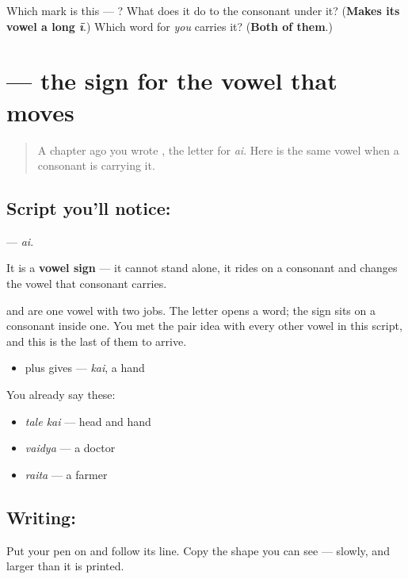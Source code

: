 \begin{tcolorbox}[breakable,colback=teal!4,colframe=teal!35!black,title={Before you move on}]
Which mark is this — ? What does it do to the consonant under it? (\textbf{Makes its vowel a long \emph{ī}}.) Which word for \emph{you} carries it? (\textbf{Both of them}.)
\end{tcolorbox}
\section[\texorpdfstring{\kn{◌ೈ} (ai)}{◌ೈ (ai)}]{ — the sign for the vowel that moves}

\label{lesson:KA-S162-vowel-sign-ai}



\begin{quote}
A chapter ago you wrote \textbf{}, the letter for \emph{ai}. Here is the same vowel when a consonant is carrying it.
\end{quote}

\subsection*{Script you'll notice: }
\textbf{} — \emph{ai}.

It is a \textbf{vowel sign} — it cannot stand alone, it rides on a consonant and changes the vowel that consonant carries.

\textbf{} and \textbf{} are one vowel with two jobs. The letter opens a word; the sign sits on a consonant inside one. You met the pair idea with every other vowel in this script, and this is the last of them to arrive.

\begin{itemize}
\raggedright
  \item \textbf{} plus \textbf{} gives \textbf{} — \emph{kai}, a hand
\end{itemize}

You already say these:

\begin{itemize}
\raggedright
  \item \textbf{ } \emph{tale kai} — head and hand
  \item \textbf{} \emph{vaidya} — a doctor
  \item \textbf{} \emph{raita} — a farmer
\end{itemize}

\subsection*{Writing: }
Put your pen on  and follow its line. Copy the shape you can see — slowly, and larger than it is printed.

